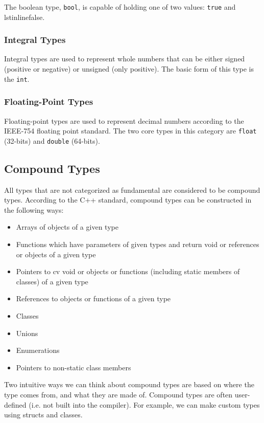 \documentclass[11pt,fancy,authoryear]{elegantbook}
\begin{document}
The boolean type, \lstinline{bool}, is capable of holding one of two values: \lstinline{true} and lstinline{false}.

\subsubsection{Integral Types}

Integral types are used to represent whole numbers that can be either signed (positive or negative) or unsigned (only positive). The basic form of this type is the \lstinline{int}.

\subsubsection{Floating-Point Types}

Floating-point types are used to represent decimal numbers according to the IEEE-754 floating point standard. The two core types in this category are \lstinline{float} (32-bits) and \lstinline{double} (64-bits).

\subsection{Compound Types}

All types that are not categorized as fundamental are considered to be compound types. According to the C++ standard, compound types can be constructed in the following ways:

\begin{itemize}
  \item Arrays of objects of a given type
  \item Functions which have parameters of given types and return void or references or objects of a given type
  \item Pointers to cv void or objects or functions (including static members of classes) of a given type
  \item References to objects or functions of a given type
  \item Classes
  \item Unions
  \item Enumerations
  \item Pointers to non-static class members
\end{itemize}

Two intuitive ways we can think about compound types are based on where the type comes from, and what they are made of. Compound types are often user-defined (i.e. not built into the compiler). For example, we can make custom types using structs and classes.
\end{document}
